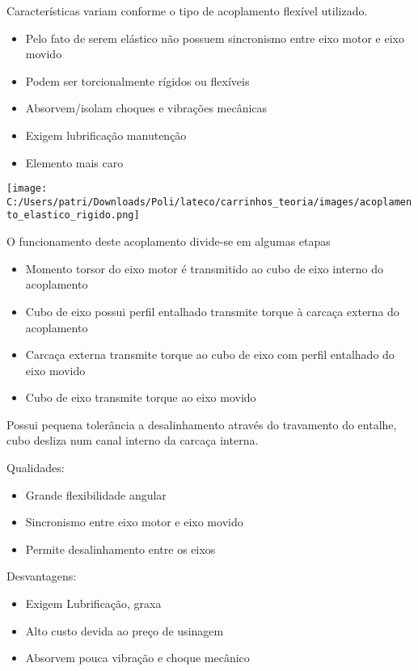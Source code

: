 \begin{namedtheorem}[Elásticos]
	Características variam conforme o tipo de acoplamento flexível utilizado.
	\begin{itemize}
		\item Pelo fato de serem elástico não possuem sincronismo entre eixo motor e eixo movido
		\item Podem ser torcionalmente rígidos ou flexíveis
		\item Absorvem/isolam choques e vibrações mecânicas
		\item Exigem lubrificação manutenção
		\item Elemento mais caro
	\end{itemize}
	
	\begin{center}
	\texttt{[image: C:/Users/patri/Downloads/Poli/lateco/carrinhos\_teoria/images/acoplamento\_elastico\_rigido.png]}
	\end{center}	
	
	O funcionamento deste acoplamento divide-se em algumas etapas
	
	\begin{itemize}
		\item Momento torsor do eixo motor é transmitido ao cubo de eixo interno do acoplamento
		\item Cubo de eixo possui perfil entalhado transmite torque à carcaça externa do acoplamento
		\item Carcaça externa transmite torque ao cubo de eixo com perfil entalhado do eixo movido
		\item Cubo de eixo transmite torque ao eixo movido
	\end{itemize}
	
	Possui pequena tolerância a desalinhamento através do travamento do entalhe, cubo desliza num canal interno da carcaça interna.
	
	Qualidades:
	\begin{itemize}
		\item Grande flexibilidade angular
		\item Sincronismo entre eixo motor e eixo movido
		\item Permite desalinhamento entre os eixos
	\end{itemize}
	
	Desvantagens:
	\begin{itemize}
		\item Exigem Lubrificação, graxa
		\item Alto custo devida ao preço de usinagem
		\item Absorvem pouca vibração e choque mecânico
	\end{itemize}
	

\end{namedtheorem}
